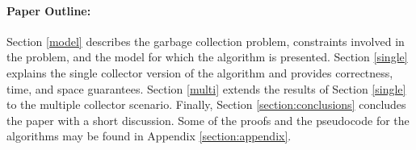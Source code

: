 
\paragraph{Paper Outline:}
Section \ref{model} describes the garbage collection problem, constraints involved in the problem, and the model for which the algorithm is presented. Section \ref{single} explains the single collector version of the algorithm and provides correctness, time, and space guarantees.
Section \ref{multi} extends the results of Section \ref{single} to the multiple collector scenario. Finally, Section \ref{section:conclusions} concludes the paper with a short discussion. Some of the proofs and the pseudocode for the algorithms may be found in Appendix \ref{section:appendix}.
